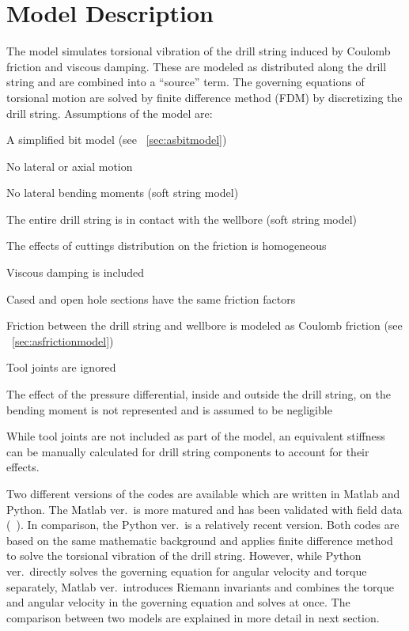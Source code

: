 \section{Model Description}
The model simulates torsional vibration of the drill string induced by Coulomb friction and viscous damping.  These are modeled as distributed along the drill string and are combined into a ``source'' term. The governing equations of torsional motion are solved by finite difference method (FDM) by discretizing the drill string. Assumptions of the model are:
\begin{bulletedlist}
	\item A simplified bit model (see \sectionname~\ref{sec:asbitmodel})
	\item No lateral or axial motion
    \item No lateral bending moments (soft string model)
    \item The entire drill string is in contact with the wellbore (soft string model)
	\item The effects of cuttings distribution on the friction is homogeneous
	\item Viscous damping is included
	\item Cased and open hole sections have the same friction factors
    \item Friction between the drill string and wellbore is modeled as Coulomb friction (see \sectionname~\ref{sec:asfrictionmodel})
    \item Tool joints are ignored
    \item The effect of the pressure differential, inside and outside the drill string, on the bending moment is not represented and is assumed to be negligible
\end{bulletedlist}
While tool joints are not included as part of the model, an equivalent stiffness can be manually calculated for drill string components to account for their effects.

Two different versions of the codes are available which are written in Matlab and Python. The Matlab ver.\ is more matured and has been validated with field data (~\cite{ref:aarsnes2017a}). In comparison, the Python ver.\ is a relatively recent version. Both codes are based on the same mathematic background and applies finite difference method to solve the torsional vibration of the drill string. However, while Python ver.\ directly solves the governing equation for angular velocity and torque separately, Matlab ver.\ introduces Riemann invariants and combines the torque and angular velocity in the governing equation and solves at once. The comparison between two models are explained in more detail in next section. 

